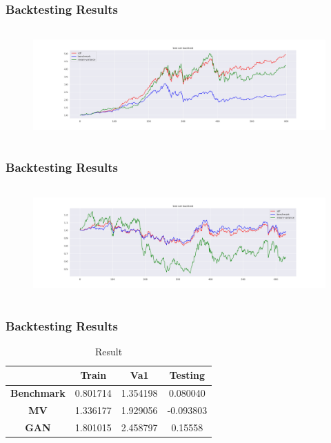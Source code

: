 \documentclass{beamer}
\begin{document}
\begin{frame}
\frametitle{Backtesting Results}
\begin{figure}
   \includegraphics[width=12cm,height=4.3cm]{val.jpg}
\end{figure}
\end{frame}

\begin{frame}
\frametitle{Backtesting Results}
\begin{figure}
   \includegraphics[width=12cm,height=4.3cm]{test.jpg}
\end{figure}
\end{frame}



\begin{frame}
\frametitle{Backtesting Results}


\begin{table}
\begin{tabular}{cccc}
\toprule
& Train & Va1 & Testing \\
\midrule
\textbf{Benchmark} & 0.801714 & 1.354198 & 0.080040 \\
\textbf{MV} & 1.336177 & 1.929056 & -0.093803 \\
\textbf{GAN} & 1.801015 & 2.458797 & 0.15558 \\
\bottomrule
\end{tabular}
\caption{Result}
\end{table}


\end{frame}
\end{document}
